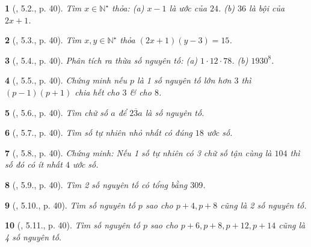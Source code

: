 \documentclass{article}
\newtheorem{baitoan}{}
\begin{document}
\begin{baitoan}[\cite{Binh_boi_duong_Toan_6_tap_1}, 5.2., p. 40]
	Tìm $x\in\mathbb{N}^\star$ thỏa: (a) $x - 1$ là ước của $24$. (b) $36$ là bội của $2x + 1$.
\end{baitoan}

\begin{baitoan}[\cite{Binh_boi_duong_Toan_6_tap_1}, 5.3., p. 40]
	Tìm $x,y\in\mathbb{N}^\star$ thỏa $(2x + 1)(y - 3) = 15$.
\end{baitoan}

\begin{baitoan}[\cite{Binh_boi_duong_Toan_6_tap_1}, 5.4., p. 40]
	Phân tích ra thừa số nguyên tố: (a) $1\cdot12\cdot78$. (b) $1930^8$.
\end{baitoan}

\begin{baitoan}[\cite{Binh_boi_duong_Toan_6_tap_1}, 5.5., p. 40]
	Chứng minh nếu $p$ là 1 số nguyên tố lớn hơn $3$ thì $(p - 1)(p + 1)$ chia hết cho $3$ \& cho $8$.
\end{baitoan}

\begin{baitoan}[\cite{Binh_boi_duong_Toan_6_tap_1}, 5.6., p. 40]
	Tìm chữ số $a$ để $\overline{23a}$ là số nguyên tố.
\end{baitoan}

\begin{baitoan}[\cite{Binh_boi_duong_Toan_6_tap_1}, 5.7., p. 40]
	Tìm số tự nhiên nhỏ nhất có đúng $18$ ước số.
\end{baitoan}

\begin{baitoan}[\cite{Binh_boi_duong_Toan_6_tap_1}, 5.8., p. 40]
	Chứng minh: Nếu 1 số tự nhiên có 3 chữ số tận cùng là $104$ thì số đó có ít nhất $4$ ước số.
\end{baitoan}

\begin{baitoan}[\cite{Binh_boi_duong_Toan_6_tap_1}, 5.9., p. 40]
	Tìm 2 số nguyên tố có tổng bằng $309$.
\end{baitoan}

\begin{baitoan}[\cite{Binh_boi_duong_Toan_6_tap_1}, 5.10., p. 40]
	Tìm số nguyên tố $p$ sao cho $p + 4,p + 8$ cũng là 2 số nguyên tố.
\end{baitoan}

\begin{baitoan}[\cite{Binh_boi_duong_Toan_6_tap_1}, 5.11., p. 40]
	Tìm số nguyên tố $p$ sao cho $p + 6,p + 8,p + 12,p + 14$ cũng là 4 số nguyên tố.
\end{baitoan}
\end{document}
